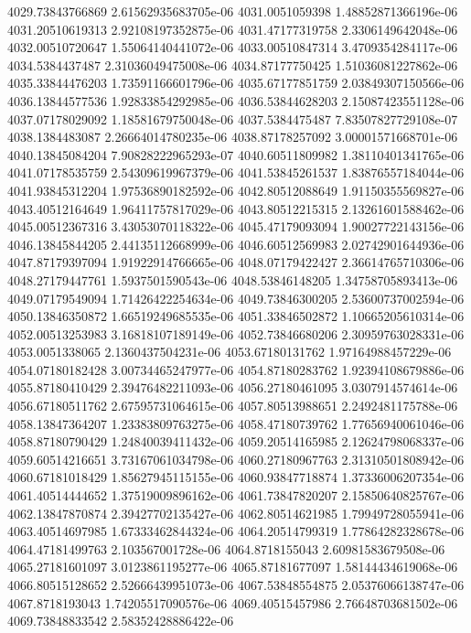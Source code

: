 {4029.73843766869 2.61562935683705e-06
4031.0051059398 1.48852871366196e-06
4031.20510619313 2.92108197352875e-06
4031.47177319758 2.3306149642048e-06
4032.00510720647 1.55064140441072e-06
4033.00510847314 3.4709354284117e-06
4034.5384437487 2.31036049475008e-06
4034.87177750425 1.51036081227862e-06
4035.33844476203 1.73591166601796e-06
4035.67177851759 2.03849307150566e-06
4036.13844577536 1.92833854292985e-06
4036.53844628203 2.15087423551128e-06
4037.07178029092 1.18581679750048e-06
4037.5384475487 7.83507827729108e-07
4038.1384483087 2.26664014780235e-06
4038.87178257092 3.00001571668701e-06
4040.13845084204 7.90828222965293e-07
4040.60511809982 1.38110401341765e-06
4041.07178535759 2.54309619967379e-06
4041.53845261537 1.83876557184044e-06
4041.93845312204 1.97536890182592e-06
4042.80512088649 1.91150355569827e-06
4043.40512164649 1.96411757817029e-06
4043.80512215315 2.13261601588462e-06
4045.00512367316 3.43053070118322e-06
4045.47179093094 1.90027722143156e-06
4046.13845844205 2.44135112668999e-06
4046.60512569983 2.02742901644936e-06
4047.87179397094 1.91922914766665e-06
4048.07179422427 2.36614765710306e-06
4048.27179447761 1.5937501590543e-06
4048.53846148205 1.34758705893413e-06
4049.07179549094 1.71426422254634e-06
4049.73846300205 2.53600737002594e-06
4050.13846350872 1.66519249685535e-06
4051.33846502872 1.10665205610314e-06
4052.00513253983 3.16818107189149e-06
4052.73846680206 2.30959763028331e-06
4053.0051338065 2.1360437504231e-06
4053.67180131762 1.97164988457229e-06
4054.07180182428 3.00734465247977e-06
4054.87180283762 1.92394108679886e-06
4055.87180410429 2.39476482211093e-06
4056.27180461095 3.0307914574614e-06
4056.67180511762 2.67595731064615e-06
4057.80513988651 2.2492481175788e-06
4058.13847364207 1.23383809763275e-06
4058.47180739762 1.77656940061046e-06
4058.87180790429 1.24840039411432e-06
4059.20514165985 2.12624798068337e-06
4059.60514216651 3.73167061034798e-06
4060.27180967763 2.31310501808942e-06
4060.67181018429 1.85627945115155e-06
4060.93847718874 1.37336006207354e-06
4061.40514444652 1.37519009896162e-06
4061.73847820207 2.15850640825767e-06
4062.13847870874 2.39427702135427e-06
4062.80514621985 1.79949728055941e-06
4063.40514697985 1.67333462844324e-06
4064.20514799319 1.77864282328678e-06
4064.47181499763 2.103567001728e-06
4064.8718155043 2.60981583679508e-06
4065.27181601097 3.0123861195277e-06
4065.87181677097 1.58144434619068e-06
4066.80515128652 2.52666439951073e-06
4067.53848554875 2.05376066138747e-06
4067.8718193043 1.74205517090576e-06
4069.40515457986 2.76648703681502e-06
4069.73848833542 2.58352428886422e-06
}
